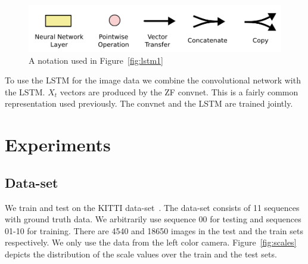 \documentclass{article}
\begin{document}
\begin{figure}[ht!]
  \centering \includegraphics[width=.5\textwidth]{LSTM2-notation}
  \caption{A notation used in Figure~\ref{fig:lstm1}}\label{fig:lstm2}
\end{figure}

To use the LSTM for the image data we combine the convolutional
network with the LSTM.  $X_t$ vectors are produced by the ZF convnet.
This is a fairly common representation used previously.  The convnet
and the LSTM are trained jointly.

\section{Experiments}

\subsection{Data-set}

We train and test on the KITTI data-set~\cite{geiger2013vision}.  The
data-set consists of 11 sequences with ground truth data.  We
arbitrarily use sequence 00 for testing and sequences 01-10 for
training.  There are 4540 and 18650 images in the test and the train
sets respectively. We only use the data from the left color camera.
Figure~\ref{fig:scales} depicts the distribution of the scale values
over the train and the test sets.
\end{document}
